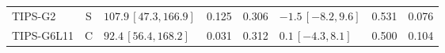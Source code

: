 \documentclass[10pt,a4paper]{article}
\begin{document}
\begin{longtable}{lcp{37mm}rrp{37mm}rr}
TIPS-G2 & S & \(107.9\,[47.3,166.9]\) & 0.125 & 0.306 & \(-1.5\,[-8.2,9.6]\) & 0.531 & 0.076\\
TIPS-G6L11 & C & \(92.4\,[56.4,168.2]\) & 0.031 & 0.312 & \(0.1\,[-4.3,8.1]\) & 0.500 & 0.104\\

\end{longtable}
\end{document}
